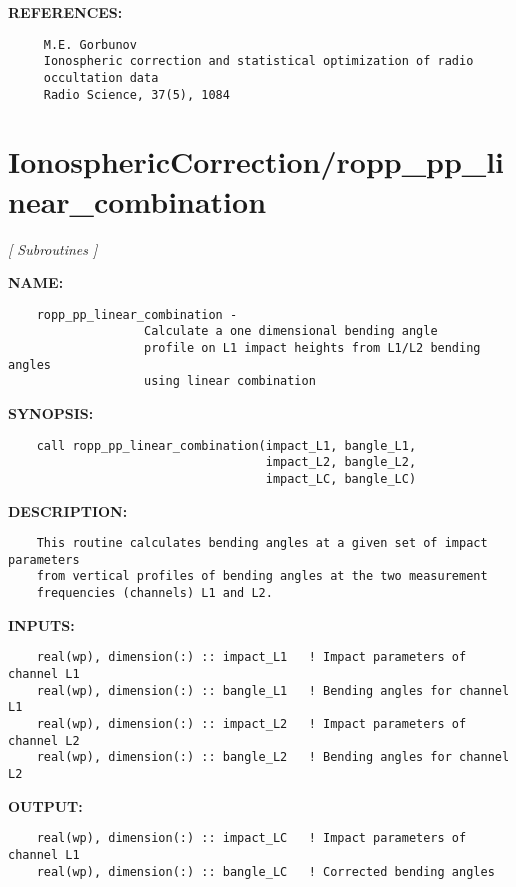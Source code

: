 \textbf{REFERENCES:}\hspace{0.08in}\begin{Verbatim}
     M.E. Gorbunov
     Ionospheric correction and statistical optimization of radio 
     occultation data
     Radio Science, 37(5), 1084
\end{Verbatim}
\section{IonosphericCorrection/ropp\_pp\_linear\_combination}
\textsl{[ Subroutines ]}

\label{ch:robo29}
\label{ch:IonosphericCorrection_ropp_pp_linear_combination}
\textbf{NAME:}\hspace{0.08in}\begin{Verbatim}
    ropp_pp_linear_combination - 
                   Calculate a one dimensional bending angle
                   profile on L1 impact heights from L1/L2 bending angles 
                   using linear combination
\end{Verbatim}
\textbf{SYNOPSIS:}\hspace{0.08in}\begin{Verbatim}
    call ropp_pp_linear_combination(impact_L1, bangle_L1, 
                                    impact_L2, bangle_L2,
                                    impact_LC, bangle_LC)
\end{Verbatim}
\textbf{DESCRIPTION:}\hspace{0.08in}\begin{Verbatim}
    This routine calculates bending angles at a given set of impact parameters
    from vertical profiles of bending angles at the two measurement 
    frequencies (channels) L1 and L2.
\end{Verbatim}
\textbf{INPUTS:}\hspace{0.08in}\begin{Verbatim}
    real(wp), dimension(:) :: impact_L1   ! Impact parameters of channel L1
    real(wp), dimension(:) :: bangle_L1   ! Bending angles for channel L1
    real(wp), dimension(:) :: impact_L2   ! Impact parameters of channel L2
    real(wp), dimension(:) :: bangle_L2   ! Bending angles for channel L2
\end{Verbatim}
\textbf{OUTPUT:}\hspace{0.08in}\begin{Verbatim}
    real(wp), dimension(:) :: impact_LC   ! Impact parameters of channel L1
    real(wp), dimension(:) :: bangle_LC   ! Corrected bending angles 
\end{Verbatim}

